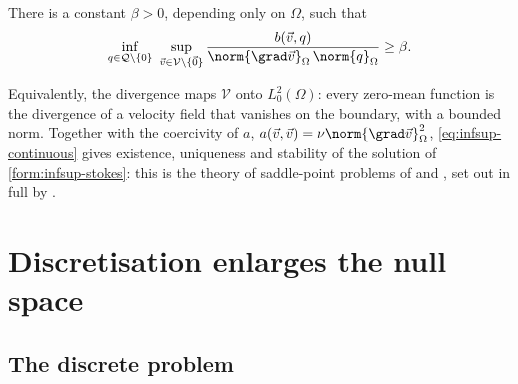 \begin{theorem}\label{thm:infsup-continuous}
There is a constant $\beta > 0$, depending only on $\Omega$, such that
\begin{equation}\label{eq:infsup-continuous}
    \inf_{q \in \mathcal{Q} \setminus \{0\}} \ \sup_{\vec{v} \in \mathcal{V} \setminus \{\vec{0}\}}
    \frac{b(\vec{v}, q)}{\norm{\grad\vec{v}}_\Omega \, \norm{q}_\Omega} \geq \beta .
\end{equation}
\end{theorem}

Equivalently, the divergence maps $\mathcal{V}$ onto $L^2_0(\Omega)$: every zero-mean function is the divergence of a velocity field that vanishes on the boundary, with a bounded norm. Together with the coercivity of $a$, $a(\vec{v}, \vec{v}) = \nu \norm{\grad\vec{v}}_\Omega^2$, \cref{eq:infsup-continuous} gives existence, uniqueness and stability of the solution of \cref{form:infsup-stokes}: this is the theory of saddle-point problems of \textcite{Babuska1973} and \textcite{Brezzi1974}, set out in full by \textcite{Boffi2013}.

\section{Discretisation enlarges the null space}\label{sec:infsup-discrete}

\subsection{The discrete problem}

